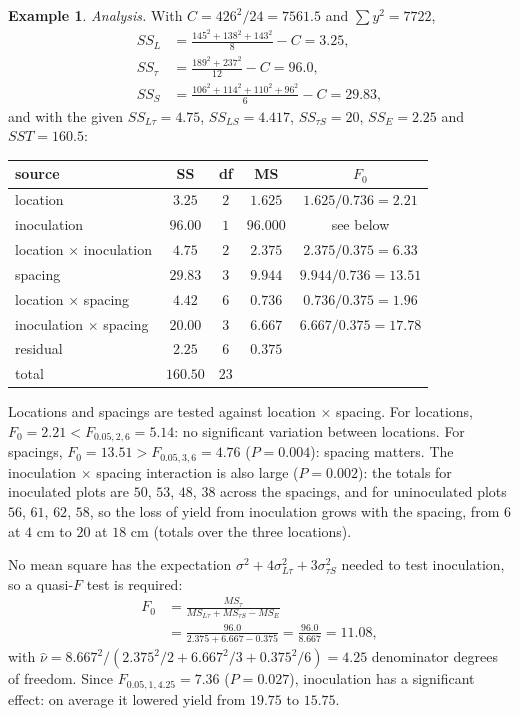 \documentclass[11pt,a4paper]{article}
\numberwithin{equation}{section}
\theoremstyle{definition}
\newtheorem{exa}[thm]{Example}
\begin{document}
\begin{exa}
\emph{Analysis.} With $C = 426^2/24 = 7561.5$ and $\sum y^2 = 7722$,
\begin{align*}
SS_L &= \frac{145^2 + 138^2 + 143^2}8 - C = 3.25 , \\
SS_\tau &= \frac{189^2 + 237^2}{12} - C = 96.0 , \\
SS_S &= \frac{106^2 + 114^2 + 110^2 + 96^2}6 - C = 29.83 ,
\end{align*}
and with the given $SS_{L\tau} = 4.75$, $SS_{LS} = 4.417$, $SS_{\tau S} = 20$, $SS_E = 2.25$ and $SST = 160.5$:
\begin{center}
\begin{tabular}{l|cccc}
source & SS & df & MS & $F_0$ \\
\hline
location & $3.25$ & $2$ & $1.625$ & $1.625/0.736 = 2.21$ \\
inoculation & $96.00$ & $1$ & $96.000$ & see below \\
location $\times$ inoculation & $4.75$ & $2$ & $2.375$ & $2.375/0.375 = 6.33$ \\
spacing & $29.83$ & $3$ & $9.944$ & $9.944/0.736 = 13.51$ \\
location $\times$ spacing & $4.42$ & $6$ & $0.736$ & $0.736/0.375 = 1.96$ \\
inoculation $\times$ spacing & $20.00$ & $3$ & $6.667$ & $6.667/0.375 = 17.78$ \\
residual & $2.25$ & $6$ & $0.375$ & \\
\hline
total & $160.50$ & $23$ & &
\end{tabular}
\end{center}
Locations and spacings are tested against location $\times$ spacing. For locations, $F_0 = 2.21 < F_{0.05, 2, 6} = 5.14$: no significant variation between locations. For
spacings, $F_0 = 13.51 > F_{0.05, 3, 6} = 4.76$ ($P = 0.004$): spacing matters. The inoculation $\times$ spacing interaction is also large ($P = 0.002$): the totals for inoculated
plots are $50$, $53$, $48$, $38$ across the spacings, and for uninoculated plots $56$, $61$, $62$, $58$, so the loss of yield from inoculation grows with the spacing, from $6$ at $4$ cm to $20$ at $18$ cm (totals over the three locations).

No mean square has the expectation $\sigma^2 + 4\sigma^2_{L\tau} + 3\sigma^2_{\tau S}$ needed to test inoculation, so a quasi-$F$ test is required:
\begin{align*}
F_0 &= \frac{MS_\tau}{MS_{L\tau} + MS_{\tau S} - MS_E} \\
&= \frac{96.0}{2.375 + 6.667 - 0.375} = \frac{96.0}{8.667} = 11.08 ,
\end{align*}
with $\hat\nu = 8.667^2/(2.375^2/2 + 6.667^2/3 + 0.375^2/6) = 4.25$ denominator degrees of freedom. Since $F_{0.05, 1, 4.25} = 7.36$ ($P = 0.027$), inoculation has a significant
effect: on average it lowered yield from $19.75$ to $15.75$.
\end{exa}
\end{document}
